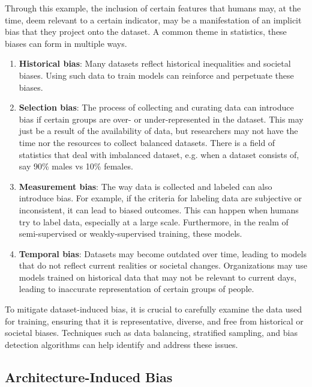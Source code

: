 \documentclass[10pt]{article}
\begin{document}
    Through this example, the inclusion of certain features that humans may, at the time, deem relevant to a certain indicator, may be a manifestation of an implicit bias that they project onto the dataset. A common theme in statistics, these biases can form in multiple ways. 
    \begin{enumerate}
      \item \textbf{Historical bias}: Many datasets reflect historical inequalities and societal biases. Using such data to train models can reinforce and perpetuate these biases.

      \item \textbf{Selection bias}: The process of collecting and curating data can introduce bias if certain groups are over- or under-represented in the dataset. This may just be a result of the availability of data, but researchers may not have the time nor the resources to collect balanced datasets. There is a field of statistics that deal with imbalanced dataset, e.g. when a dataset consists of, say 90\% males vs 10\% females. 

      \item \textbf{Measurement bias}: The way data is collected and labeled can also introduce bias. For example, if the criteria for labeling data are subjective or inconsistent, it can lead to biased outcomes. This can happen when humans try to label data, especially at a large scale. Furthermore, in the realm of semi-supervised  or weakly-supervised training, these models. 

      \item \textbf{Temporal bias}: Datasets may become outdated over time, leading to models that do not reflect current realities or societal changes. Organizations may use models trained on historical data that may not be relevant to current days, leading to inaccurate representation of certain groups of people.  
    \end{enumerate}

    To mitigate dataset-induced bias, it is crucial to carefully examine the data used for training, ensuring that it is representative, diverse, and free from historical or societal biases. Techniques such as data balancing, stratified sampling, and bias detection algorithms can help identify and address these issues.

  \subsection{Architecture-Induced Bias}
\end{document}
